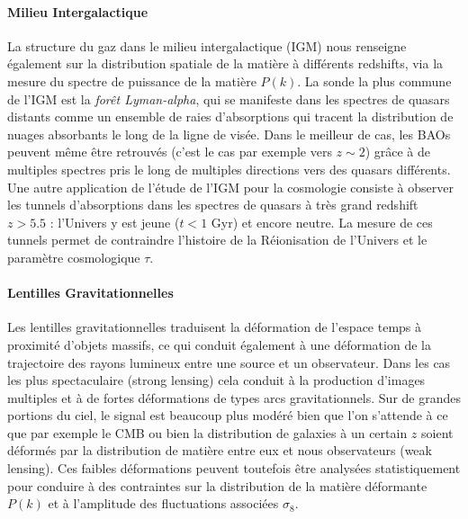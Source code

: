 \paragraph{Milieu Intergalactique}
La structure du gaz dans le milieu intergalactique (IGM) nous renseigne également sur la distribution spatiale de la matière à différents redshifts, via la mesure du spectre de puissance de la matière $P(k)$. La sonde la plus commune de l'IGM est la \textit{forêt Lyman-alpha}, qui se manifeste dans les spectres de quasars distants comme un ensemble de raies d'absorptions qui tracent la distribution de nuages absorbants le long de la ligne de visée. Dans le meilleur de cas, les BAOs peuvent même être retrouvés (c'est le cas par exemple vers $z\sim2$) grâce à de multiples spectres pris le long de multiples directions vers des quasars différents. Une autre application de l'étude de l'IGM pour la cosmologie consiste à observer les tunnels d'absorptions dans les spectres de quasars à très grand redshift $z>5.5$ : l'Univers y est jeune ($t<1$ Gyr) et encore neutre. La mesure de ces tunnels permet de contraindre l'histoire de la Réionisation de l'Univers et le paramètre cosmologique $\tau$.

\paragraph{Lentilles Gravitationnelles}
Les lentilles gravitationnelles traduisent la déformation de l'espace temps à proximité d'objets massifs, ce qui conduit également à une déformation de la trajectoire des rayons lumineux entre une source et un observateur. Dans les cas les plus spectaculaire (strong lensing) cela conduit à la production d'images multiples et à de fortes déformations de types arcs gravitationnels. Sur de grandes portions du ciel, le signal est beaucoup plus modéré bien que l'on s'attende à ce que par exemple le CMB ou bien la distribution de galaxies à un certain $z$ soient déformés par la distribution de matière entre eux et nous observateurs (weak lensing). Ces faibles déformations peuvent toutefois être analysées statistiquement pour conduire à des contraintes sur la distribution de la matière déformante $P(k)$ et à l'amplitude des fluctuations associées $\sigma_8$.

